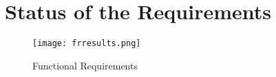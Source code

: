 \tocless\chapter{Status of the Requirements}
\begin{figure}[H]
	\centering
	\texttt{[image: frresults.png]}
	\caption{Functional Requirements}
\end{figure}


\clearpage
{}









